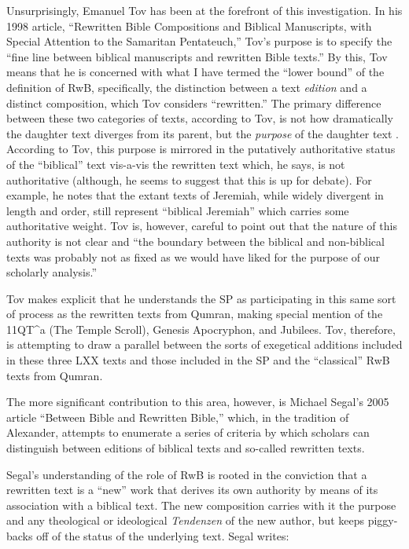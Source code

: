 Unsurprisingly, Emanuel Tov has been at the forefront of this
investigation. In his 1998 article, ``Rewritten Bible Compositions and
Biblical Manuscripts, with Special Attention to the Samaritan
Pentateuch,'' Tov's purpose is to specify the ``fine line between
biblical manuscripts and rewritten Bible
texts.''\autocite[334]{tov_dsd1998} By this, Tov means that he is
concerned with what I have termed the ``lower bound'' of the definition
of RwB, specifically, the distinction between a text \emph{edition} and
a distinct composition, which Tov considers ``rewritten.'' The primary
difference between these two categories of texts, according to Tov, is
not how dramatically the daughter text diverges from its parent, but the
\emph{purpose} of the daughter text \autocite[334]{tov_dsd1998}.
According to Tov, this purpose is mirrored in the putatively
authoritative status of the ``biblical'' text vis-a-vis the rewritten
text which, he says, is not authoritative (although, he seems to suggest
that this is up for debate\autocite[337]{tov_dsd1998}). For example, he
notes that the extant texts of Jeremiah, while widely divergent in
length and order, still represent ``biblical Jeremiah'' which carries
some authoritative weight. Tov is, however, careful to point out that
the nature of this authority is not clear and ``the boundary between the
biblical and non-biblical texts was probably not as fixed as we would
have liked for the purpose of our scholarly
analysis.''\autocite[335]{tov_dsd1998}

Tov makes explicit that he understands the SP as participating in this
same sort of process as the rewritten texts from Qumran, making special
mention of the 11QT\^{}a (The Temple Scroll), Genesis Apocryphon, and
Jubilees. Tov, therefore, is attempting to draw a parallel between the
sorts of exegetical additions included in these three LXX texts and
those included in the SP and the ``classical'' RwB texts from Qumran.

The more significant contribution to this area, however, is Michael
Segal's 2005 article ``Between Bible and Rewritten Bible,'' which, in
the tradition of Alexander, attempts to enumerate a series of criteria
by which scholars can distinguish between editions of biblical texts and
so-called rewritten texts.

Segal's understanding of the role of RwB is rooted in the conviction
that a rewritten text is a ``new'' work that derives its own authority
by means of its association with a biblical text. The new composition
carries with it the purpose and any theological or ideological
\emph{Tendenzen} of the new author, but keeps piggy-backs off of the
status of the underlying text.\autocite[11]{segal_henze2005} Segal
writes:

